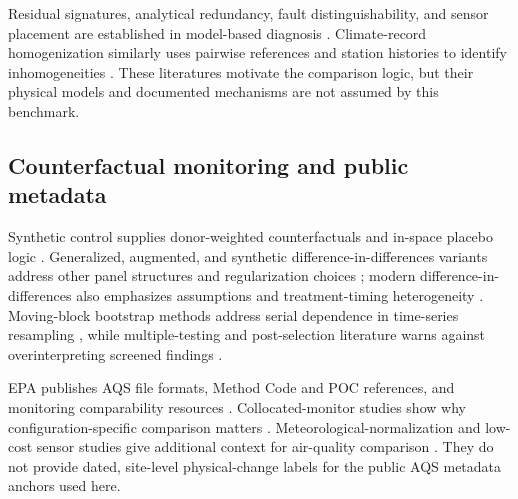 Residual signatures, analytical redundancy, fault distinguishability, and
sensor placement are established in model-based diagnosis
\citep{chowwillsky1984,krysander2008,taiebat2017}. Climate-record
homogenization similarly uses pairwise references and station histories to
identify inhomogeneities \citep{menne2009,williams2012}. These literatures
motivate the comparison logic, but their physical models and documented
mechanisms are not assumed by this benchmark.

\subsection{Counterfactual monitoring and public metadata}

Synthetic control supplies donor-weighted counterfactuals and in-space placebo
logic \citep{abadie2010,abadie2015,abadie2021}. Generalized, augmented, and
synthetic difference-in-differences variants address other panel structures and
regularization choices \citep{xu2017,benmichael2021,arkhangelsky2021}; modern
difference-in-differences also emphasizes assumptions and treatment-timing
heterogeneity \citep{callaway2021,goodmanbacon2021}. Moving-block bootstrap
methods address serial dependence in time-series resampling
\citep{kuensch1989}, while multiple-testing and post-selection literature
warns against overinterpreting screened findings
\citep{benjamini1995,berk2013}.

EPA publishes AQS file formats, Method Code and POC references, and monitoring
comparability resources
\citep{epa_obtaining_aqs,epa_airdata_formats,epa_method_code,epa_poc,epa_pm25_comparability}.
Collocated-monitor studies show why configuration-specific comparison matters
\citep{khan2024}. Meteorological-normalization and low-cost sensor studies give
additional context for air-quality comparison
\citep{gagliardi2022,grange2019,zheng2023,clements2017,barkjohn2021,chu2020}.
They do not provide dated, site-level physical-change labels for the public AQS
metadata anchors used here.

